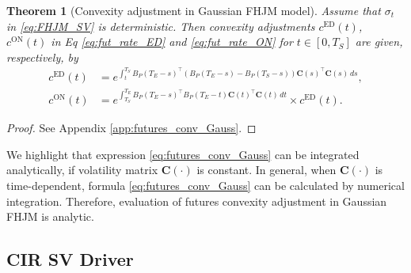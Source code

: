 \documentclass[pdftex,11pt,a4paper] {article}
\newtheorem{theorem}{Theorem}[section]
\begin{document}
\begin{theorem}[Convexity adjustment in Gaussian FHJM model]\label{thm:futures_conv_Gauss}
Assume that $\sigma_t$ in \eqref{eq:FHJM_SV} is deterministic. Then convexity adjustments $c^{\mathrm{ED}}(t)$, $c^{\mathrm{ON}}(t)$ in Eq \eqref{eq:fut_rate_ED} and \eqref{eq:fut_rate_ON} for $t\in [0,T_S]$  are given, respectively, by
\begin{equation}\label{eq:futures_conv_Gauss}
\begin{split}
c^{\mathrm{ED}}(t)&=e^{\int_{t}^{T_S}B_P(T_E-s)^\top\left(B_P(T_E-s)-B_P(T_S-s)\right)\mathbf{C}(s)^\top\mathbf{C}(s)\,ds},\\
c^{\mathrm{ON}}(t)&=e^{\int_{T_S}^{T_E}B_P(T_E-s)^\top B_P(T_E-t)\mathbf{C}(t)^\top\mathbf{C}(t)\,dt}\times c^{\mathrm{ED}}(t).
\end{split}
\end{equation}
\end{theorem}

\begin{proof}
See Appendix \ref{app:futures_conv_Gauss}.
\end{proof}

We highlight that expression \eqref{eq:futures_conv_Gauss} can be integrated analytically, if volatility matrix $\mathbf{C}(\cdot)$ is constant. In general, when $\mathbf{C}(\cdot)$ is time-dependent, formula \eqref{eq:futures_conv_Gauss} can be calculated by numerical integration. Therefore, evaluation of futures convexity adjustment in Gaussian FHJM is analytic.  



\subsection{CIR SV Driver}
\end{document}
